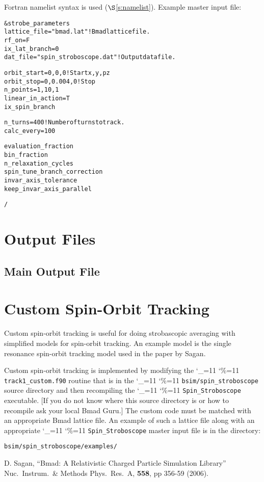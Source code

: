 \documentclass[11pt,openany]{report}
\newcommand\dottcmd[1]{\texttt{#1}\endgroup}
\newcommand{\vn}{\begingroup\catcode`\_=11 \catcode`\%=11 \dottcmd}
\newcommand{\sss}{\vn{Spin_Stroboscope}\xspace}
\newcommand{\sref}[1]{$\S$\ref{#1}}
\newlength{\ExBeg}
\newlength{\ExEnd}
\newenvironment{example}
  {\vspace{\ExBeg} \begin{alltt}}
  {\end{alltt} \vspace{\ExEnd}}
\begin{document}
Fortran namelist syntax is used (\sref{s:namelist}). Example master input file:
\begin{example}
  &strobe_parameters
    lattice_file = "bmad.lat"                ! Bmad lattice file.
    rf_on = F
    ix_lat_branch = 0
    dat_file     = "spin_stroboscope.dat"    ! Output data file.

    orbit_start = 0, 0, 0                    ! Start x, y, pz
    orbit_stop = 0, 0.004, 0                 ! Stop
    n_points = 1, 10, 1
    linear_in_action = T
    ix_spin_branch

    n_turns = 400                            ! Number of turns to track.
    calc_every = 100

    evaluation_fraction
    bin_fraction
    n_relaxation_cycles
    spin_tune_branch_correction
    invar_axis_tolerance
    keep_invar_axis_parallel
    

  /
\end{example}

  \begin{description}
  \item
  \end{description}

\chapter{Output Files} 

\section{Main Output File}
\label{s:main.out}

\chapter{Custom Spin-Orbit Tracking}

Custom spin-orbit tracking is useful for doing strobascopic averaging with simplified models for
spin-orbit tracking. An example model is the single resonance spin-orbit tracking model used in the
paper by Sagan. 

Custom spin-orbit tracking is implemented by modifying the \vn{track1_custom.f90} routine that is in
the \vn{bsim/spin_stroboscope} source directory and then recompiling the \sss executable. [If you do
not know where this source directory is or how to recompile ask your local Bmad Guru.] The custom
code must be matched with an appropriate Bmad lattice file. An example of such a lattice file along
with an appropriate \sss master input file is in the directory:
\begin{example}
  bsim/spin_stroboscope/examples/
\end{example}


\begin{thebibliography}{9}

D. Sagan,
``Bmad: A Relativistic Charged Particle Simulation Library''
Nuc.\ Instrum.\ \& Methods Phys.\ Res.\ A, {\bf 558}, pp 356-59 (2006).

\end{thebibliography}
\end{document}

